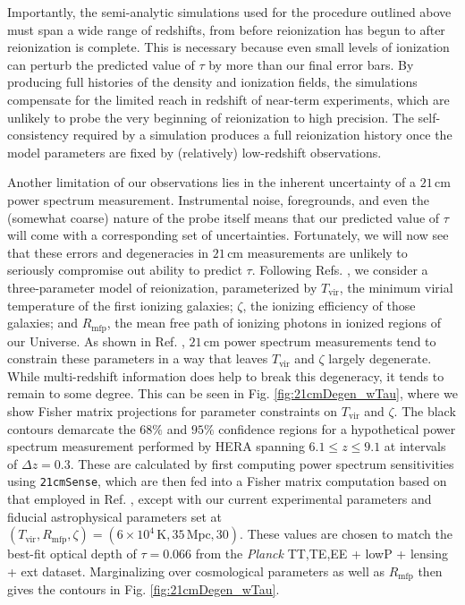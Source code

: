 \documentclass[twocolumn,aps,prd,nofootinbib,showpacs]{revtex4-1}
\begin{document}
Importantly, the semi-analytic simulations used for the procedure outlined above must span a wide range of redshifts, from before reionization has begun to after reionization is complete. This is necessary because even small levels of ionization can perturb the predicted value of $\tau$ by more than our final error bars. By producing full histories of the density and ionization fields, the simulations compensate for the limited reach in redshift of near-term experiments, which are unlikely to probe the very beginning of reionization to high precision. The self-consistency required by a simulation produces a full reionization history once the model parameters are fixed by (relatively) low-redshift observations.

Another limitation of our observations lies in the inherent uncertainty of a $21\,\textrm{cm}$ power spectrum measurement. Instrumental noise, foregrounds, and even the (somewhat coarse) nature of the probe itself means that our predicted value of $\tau$ will come with a corresponding set of uncertainties. Fortunately, we will now see that these errors and degeneracies in $21\,\textrm{cm}$ measurements are unlikely to seriously compromise out ability to predict $\tau$. Following Refs. \cite{mesinger_et_al2012,pober_et_al2014}, we consider a three-parameter model of reionization, parameterized by $T_\textrm{vir}$, the minimum virial temperature of the first ionizing galaxies; $\zeta$, the ionizing efficiency of those galaxies; and $R_\textrm{mfp}$, the mean free path of ionizing photons in ionized regions of our Universe. As shown in Ref. \cite{pober_et_al2014}, $21\,\textrm{cm}$ power spectrum measurements tend to constrain these parameters in a way that leaves $T_\textrm{vir}$ and $\zeta$ largely degenerate. While multi-redshift information does help to break this degeneracy, it tends to remain to some degree. This can be seen in Fig. \ref{fig:21cmDegen_wTau}, where we show Fisher matrix projections for parameter constraints on $T_\textrm{vir}$ and $\zeta$. The black contours demarcate the $68\%$ and $95\%$ confidence regions for a hypothetical power spectrum measurement performed by HERA spanning $6.1 \leq z \leq 9.1$ at intervals of $\Delta z = 0.3$. These are calculated by first computing power spectrum sensitivities using {\tt 21cmSense}, which are then fed into a Fisher matrix computation based on that employed in Ref. \cite{pober_et_al2014}, except with our current experimental parameters and fiducial astrophysical parameters set at $(T_\textrm{vir}, R_\textrm{mfp}, \zeta) = (6 \times 10^4\,\textrm{K}, 35\,\textrm{Mpc}, 30)$. These values are chosen to match the best-fit optical depth of $\tau =0.066$ from the \emph{Planck} TT,TE,EE + lowP + lensing + ext dataset. Marginalizing over cosmological parameters as well as $R_\textrm{mfp}$ then gives the contours in Fig. \ref{fig:21cmDegen_wTau}.
\end{document}
